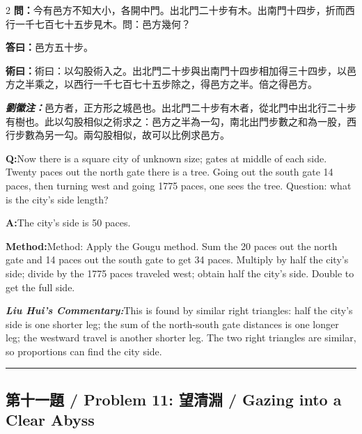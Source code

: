 \documentclass[11pt,a4paper]{article}
\newcommand{\cnwen}{\textcolor{cnlabelfg}{\textbf{問：}}}
\newcommand{\cnda}{\textbf{答曰：}}
\newcommand{\cnshu}{\textcolor{cnlabelfg}{\textbf{術曰：}}}
\newcommand{\cnzhu}{\textcolor{commentarycolor}{\textit{\textbf{劉徽注：}}}}
\newcommand{\enwen}{\textcolor{enlabelfg}{\textbf{Q:}}}
\newcommand{\enda}{\textcolor{enlabelfg}{\textbf{A:}}}
\newcommand{\enshu}{\textcolor{enlabelfg}{\textbf{Method:}}}
\newcommand{\enzhu}{\textcolor{enlabelfg}{\textit{\textbf{Liu Hui's Commentary:}}}}
\begin{document}
\begin{paracol}{2}
\switchcolumn[0]
\cnwen 今有邑方不知大小，各開中門。出北門二十步有木。出南門十四步，折而西行一千七百七十五步見木。問：邑方幾何？

\cnda 邑方五十步。

\cnshu 術曰：以勾股術入之。出北門二十步與出南門十四步相加得三十四步，以邑方之半乘之，以西行一千七百七十五步除之，得邑方之半。倍之得邑方。

\cnzhu 邑方者，正方形之城邑也。出北門二十步有木者，從北門中出北行二十步有樹也。此以勾股相似之術求之：邑方之半為一勾，南北出門步數之和為一股，西行步數為另一勾。兩勾股相似，故可以比例求邑方。

\switchcolumn[1]
\enwen Now there is a square city of unknown size; gates at middle of each side. Twenty paces out the north gate there is a tree. Going out the south gate 14 paces, then turning west and going 1775 paces, one sees the tree. Question: what is the city's side length?

\enda The city's side is 50 paces.

\enshu Method: Apply the Gougu method. Sum the 20 paces out the north gate and 14 paces out the south gate to get 34 paces. Multiply by half the city's side; divide by the 1775 paces traveled west; obtain half the city's side. Double to get the full side.

\enzhu This is found by similar right triangles: half the city's side is one shorter leg; the sum of the north-south gate distances is one longer leg; the westward travel is another shorter leg. The two right triangles are similar, so proportions can find the city side.
\end{paracol}

\bigskip\hrule\bigskip

\subsection{第十一題 / Problem 11: 望清淵 / Gazing into a Clear Abyss}
\end{document}
